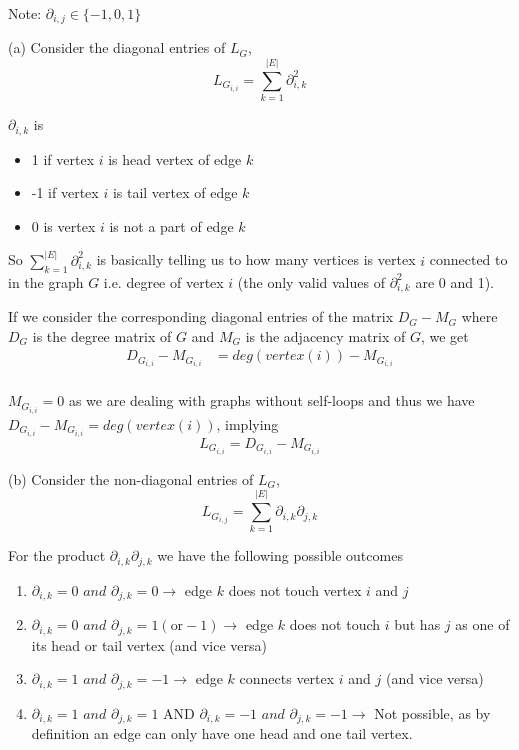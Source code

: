 \documentclass[12pt,a4paper]{article}
\begin{document}
Note: $\partial_{i,j} \in \{-1,0,1\}$

(a) Consider the diagonal entries of $L_G$,
\begin{equation}
    L_{G_{i,i}} = \sum\limits_{k=1}^{|E|} \partial_{i,k}^2
\end{equation}

$\partial_{i,k}$ is 
\begin{itemize}
    \item 1 if vertex $i$ is head vertex of edge $k$
    \item -1 if vertex $i$ is tail vertex of edge $k$
    \item 0 is vertex $i$ is not a part of edge $k$
\end{itemize}

So $\sum\limits_{k=1}^{|E|} \partial_{i,k}^2$ is basically telling us to how many vertices is vertex $i$ connected to in the graph $G$ i.e. degree of vertex $i$ (the only valid values of $\partial_{i,k}^2$ are 0 and 1).

If we consider the corresponding diagonal entries of the matrix $D_G - M_G$ where $D_G$ is the degree matrix of $G$ and $M_G$ is the adjacency matrix of $G$, we get
\begin{align*}
    D_{G_{i,i}} - M_{G_{i,i}} &= deg(vertex(i)) - M_{G_{i,i}} \\
\end{align*}

$M_{G_{i,i}} = 0$ as we are dealing with graphs without self-loops and thus we have $D_{G_{i,i}} - M_{G_{i,i}} = deg(vertex(i))$, implying
\begin{equation}
    L_{G_{i,i}}  = D_{G_{i,i}} - M_{G_{i,i}} \label{eq:12}
\end{equation}

(b) Consider the non-diagonal entries of $L_G$,
\begin{equation}
    L_{G_{i,j}} = \sum\limits_{k=1}^{|E|} \partial_{i,k}\partial_{j,k} \label{eq:13}
\end{equation}

For the product $\partial_{i,k}\partial_{j,k}$ we have the following possible outcomes
\begin{enumerate}
    \item $\partial_{i,k}=0\textit{ and }\partial_{j,k}=0 \rightarrow$ edge $k$ does not touch vertex $i$ and $j$
    \item $\partial_{i,k}=0\textit{ and }\partial_{j,k}=1(\text{or}-1) \rightarrow$ edge $k$ does not touch $i$ but has $j$ as one of its head or tail vertex (and vice versa)
    \item $\partial_{i,k}=1\textit{ and }\partial_{j,k}=-1 \rightarrow$ edge $k$ connects vertex $i$ and $j$ (and vice versa)
    \item $\partial_{i,k}=1\textit{ and }\partial_{j,k}=1$ AND $\partial_{i,k}=-1\textit{ and }\partial_{j,k}=-1 \rightarrow$ Not possible, as by definition an edge can only have one head and one tail vertex.
\end{enumerate}
\end{document}
